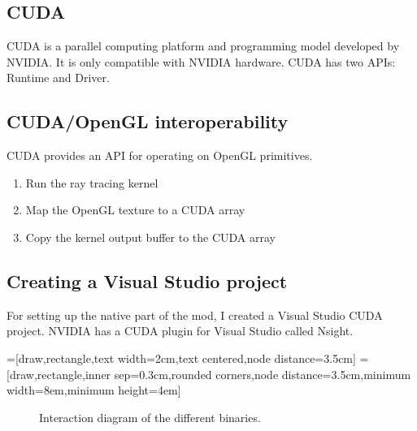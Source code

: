 \documentclass[]{article}
\begin{document}
\subsection{CUDA}
CUDA is a parallel computing platform and programming model developed by NVIDIA.
It is only compatible with NVIDIA hardware.
CUDA has two APIs: Runtime and Driver.
\subsection{CUDA/OpenGL interoperability}
CUDA provides an API for operating on OpenGL primitives.
\begin{enumerate}
  \item Run the ray tracing kernel
  \item Map the OpenGL texture to a CUDA array
  \item Copy the kernel output buffer to the CUDA array
\end{enumerate}

\subsection{Creating a Visual Studio project}
For setting up the native part of the mod, I created a Visual Studio CUDA project.
NVIDIA has a CUDA plugin for Visual Studio called Nsight.

=[draw,rectangle,text width=2cm,text centered,node distance=3.5cm]
=[draw,rectangle,inner sep=0.3cm,rounded corners,node distance=3.5cm,minimum width=8em,minimum height=4em]
\begin{figure}
  \centering
  \caption[Binary interaction]{Interaction diagram of the different binaries.}
  \label{fig:modules}
\end{figure}
\end{document}
